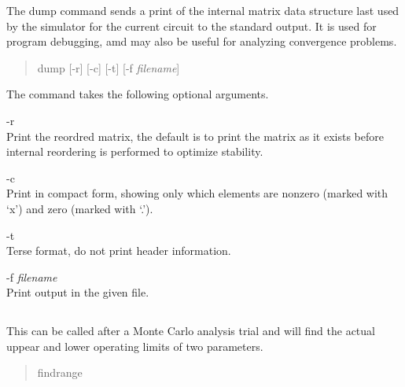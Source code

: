 
The {\cb dump} command sends a print of the internal matrix data
structure last used by the simulator for the current circuit to the
standard output.  It is used for program debugging, amd may also be
useful for analyzing convergence problems.

\begin{quote}
{\vt dump} [{\vt -r}] [{\vt -c}] [{\vt -t}] [{\vt -f} {\it filename\/}]
\end{quote}

The command takes the following optional arguments.
\begin{description} 
\item{\vt -r}\\
Print the reordred matrix, the default is to print the matrix as it
exists before internal reordering is performed to optimize stability.

\item{\vt -c}\\
Print in compact form, showing only which elements are nonzero (marked
with `x') and zero (marked with `.').

\item{-t}\\
Terse format, do not print header information.

\item{\vt -f} {\it filename}\\
Print output in the given file.
\end{description}

\subsection{}


This can be called after a Monte Carlo analysis trial and will find
the actual uppear and lower operating limits of two parameters.
\begin{quote}\vt
findrange
\end{quote}

\subsection{}


